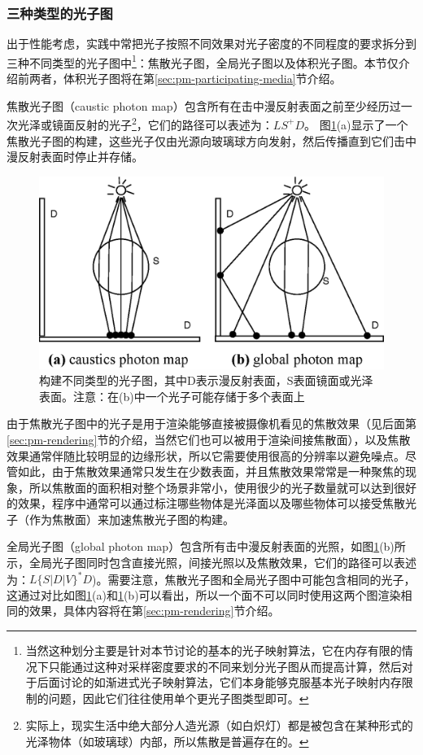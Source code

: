 \subsubsection{三种类型的光子图}\label{sec:pm-three-photon-maps}
出于性能考虑，实践中常把光子按照不同效果对光子密度的不同程度的要求拆分到三种不同类型的光子图中\footnote{当然这种划分主要是针对本节讨论的基本的光子映射算法，它在内存有限的情况下只能通过这种对采样密度要求的不同来划分光子图从而提高计算，然后对于后面讨论的如渐进式光子映射算法，它们本身能够克服基本光子映射内存限制的问题，因此它们往往使用单个更光子图类型即可。}：焦散光子图，全局光子图以及体积光子图。本节仅介绍前两者，体积光子图将在第\ref{sec:pm-participating-media}节介绍。

焦散光子图（caustic photon map）包含所有在击中漫反射表面之前至少经历过一次光泽或镜面反射的光子\footnote{实际上，现实生活中绝大部分人造光源（如白炽灯）都是被包含在某种形式的光泽物体（如玻璃球）内部，所以焦散是普遍存在的。}，它们的路径可以表述为：$LS^{+}D$。 图\ref{f:pm-photon-maps}(a)显示了一个焦散光子图的构建，这些光子仅由光源向玻璃球方向发射，然后传播直到它们击中漫反射表面时停止并存储。

\begin{figure}
\sidecaption
	\includegraphics[width=.65\textwidth]{figures/pm/photon-maps}
\caption{构建不同类型的光子图，其中D表示漫反射表面，S表面镜面或光泽表面。注意：在(b)中一个光子可能存储于多个表面上}
\label{f:pm-photon-maps}
\end{figure}

由于焦散光子图中的光子是用于渲染能够直接被摄像机看见的焦散效果（见后面第\ref{sec:pm-rendering}节的介绍，当然它们也可以被用于渲染间接焦散面），以及焦散效果通常伴随比较明显的边缘形状，所以它需要使用很高的分辨率以避免噪点。尽管如此，由于焦散效果通常只发生在少数表面，并且焦散效果常常是一种聚焦的现象，所以焦散面的面积相对整个场景非常小，使用很少的光子数量就可以达到很好的效果，程序中通常可以通过标注哪些物体是光泽面以及哪些物体可以接受焦散光子（作为焦散面）来加速焦散光子图的构建。

全局光子图（global photon map）包含所有击中漫反射表面的光照，如图\ref{f:pm-photon-maps}(b)所示，全局光子图同时包含直接光照，间接光照以及焦散效果，它们的路径可以表述为：$L\{S|D|V\}^{*}D$)。需要注意，焦散光子图和全局光子图中可能包含相同的光子，这通过对比如图\ref{f:pm-photon-maps}(a)和\ref{f:pm-photon-maps}(b)可以看出，所以一个面不可以同时使用这两个图渲染相同的效果，具体内容将在第\ref{sec:pm-rendering}节介绍。





